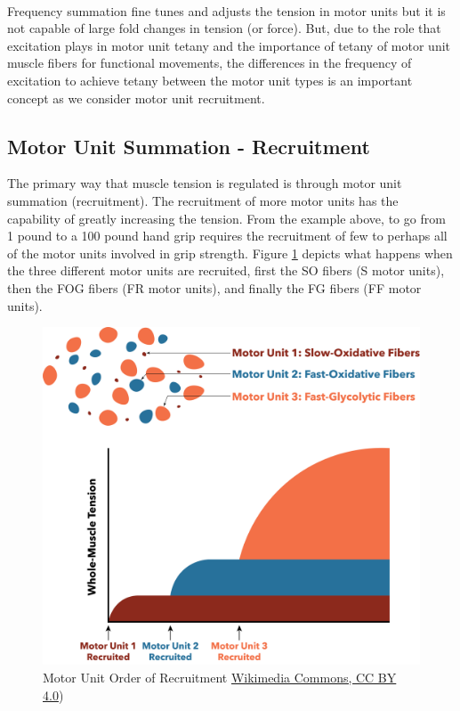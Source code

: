 \paragraph{}

Frequency summation fine tunes and adjusts the tension in motor units but it is not capable of large fold changes in tension (or force). But, due to the role that excitation plays in motor unit tetany and the importance of tetany of motor unit muscle fibers for functional movements, the differences in the frequency of excitation to achieve tetany between the motor unit types is an important concept as we consider motor unit recruitment.

\subsection{Motor Unit Summation - Recruitment}

The primary way that muscle tension is regulated is through motor unit summation (recruitment). The recruitment of more motor units has the capability of greatly increasing the tension. From the example above, to go from 1 pound to a 100 pound hand grip requires the recruitment of few to perhaps all of the motor units involved in grip strength. Figure \ref{fig:Motor_unit_recruitment} depicts what happens when the three different motor units are recruited, first the SO fibers (S motor units), then the FOG fibers (FR motor units), and finally the FG fibers (FF motor units).\footnotemark{}


\begin{figure}[!h]
    \centering
    \includegraphics[width=1\linewidth]{./figure/Motor_unit_recruitment.png}
    \caption{Motor Unit Order of Recruitment \footnotesize{\href{https://commons.wikimedia.org/wiki/File:Motor_unit_recruitment.png}{Wikimedia Commons, CC BY 4.0})}}
    \label{fig:Motor_unit_recruitment}
\end{figure}

